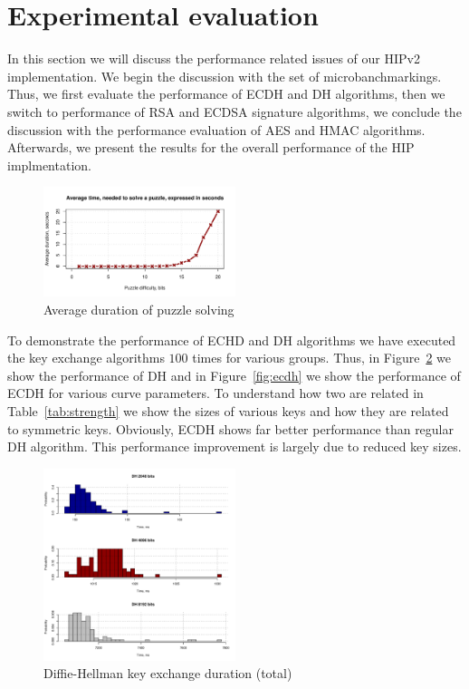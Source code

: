 \section{Experimental evaluation}
\label{section:experiments}

In this section we will discuss the performance related issues of our 
HIPv2 implementation. We begin the discussion with the set of 
microbanchmarkings. Thus, we first evaluate the performance of ECDH and DH
algorithms, then we switch to performance of RSA and ECDSA signature
algorithms, we conclude the discussion with the performance evaluation of AES and HMAC 
algorithms. Afterwards, we present the results for the overall performance 
of the HIP implmentation.

\begin{figure}
	\includegraphics[width=0.5\textwidth]{graphics/puzzle_solution_perf.pdf}
	\caption{Average duration of puzzle solving}
	\label{fig:puzzle}
\end{figure}

To demonstrate the performance of ECHD and DH algorithms we have 
executed the key exchange algorithms $100$ times for various 
groups. Thus, in Figure~\ref{fig:dh} we show the performance of
DH and in Figure~\ref{fig:ecdh} we show the performance 
of ECDH for various curve parameters. To understand how two
are related in Table~\ref{tab:strength} we show the sizes
of various keys and how they are related to symmetric keys.
Obviously, ECDH shows far better performance than regular
DH algorithm. This performance improvement is largely due
to reduced key sizes.

\begin{figure}
	\includegraphics[width=0.5\textwidth]{graphics/dh_computation_hist.pdf}
	\caption{Diffie-Hellman key exchange duration (total)}
	\label{fig:dh}
\end{figure}

